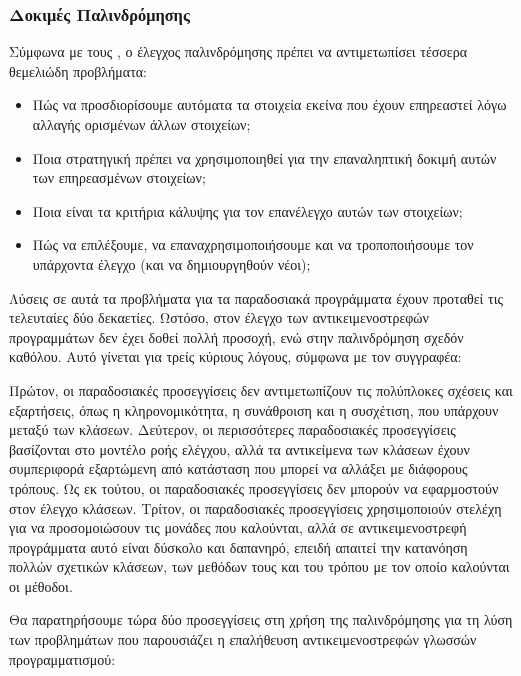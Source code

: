 \documentclass[12pt]{article}
\begin{document}
\subsubsection{Δοκιμές Παλινδρόμησης}

Σύμφωνα με τους \textcite{kung}, ο έλεγχος παλινδρόμησης πρέπει να αντιμετωπίσει τέσσερα θεμελιώδη προβλήματα:

\begin{itemize}
\item Πώς να προσδιορίσουμε αυτόματα τα στοιχεία εκείνα που έχουν επηρεαστεί λόγω αλλαγής ορισμένων άλλων στοιχείων;
\item Ποια στρατηγική πρέπει να χρησιμοποιηθεί για την επαναληπτική δοκιμή αυτών των επηρεασμένων στοιχείων;
\item Ποια είναι τα κριτήρια κάλυψης για τον επανέλεγχο αυτών των στοιχείων;
\item Πώς να επιλέξουμε, να επαναχρησιμοποιήσουμε και να τροποποιήσουμε τον υπάρχοντα έλεγχο (και να δημιουργηθούν νέοι);
\end{itemize} 

\par Λύσεις σε αυτά τα προβλήματα για τα παραδοσιακά προγράμματα έχουν προταθεί τις τελευταίες δύο δεκαετίες. Ωστόσο, στον έλεγχο των αντικειμενοστρεφών προγραμμάτων δεν έχει δοθεί πολλή προσοχή, ενώ στην παλινδρόμηση σχεδόν καθόλου. Αυτό γίνεται για τρείς κύριους λόγους, σύμφωνα με τον συγγραφέα:

\par Πρώτον, οι παραδοσιακές προσεγγίσεις δεν αντιμετωπίζουν τις πολύπλοκες σχέσεις και εξαρτήσεις, όπως η κληρονομικότητα, η συνάθροιση και η συσχέτιση, που υπάρχουν μεταξύ των κλάσεων. Δεύτερον, οι περισσότερες παραδοσιακές προσεγγίσεις βασίζονται στο μοντέλο ροής ελέγχου, αλλά τα αντικείμενα των κλάσεων έχουν συμπεριφορά εξαρτώμενη από κατάσταση που μπορεί να αλλάξει με διάφορους τρόπους. Ως εκ τούτου, οι παραδοσιακές προσεγγίσεις δεν μπορούν να εφαρμοστούν στον έλεγχο κλάσεων. Τρίτον, οι παραδοσιακές προσεγγίσεις χρησιμοποιούν στελέχη για να προσομοιώσουν τις μονάδες που καλούνται, αλλά σε αντικειμενοστρεφή προγράμματα αυτό είναι δύσκολο και δαπανηρό, επειδή απαιτεί την κατανόηση πολλών σχετικών κλάσεων, των μεθόδων τους και του τρόπου με τον οποίο καλούνται οι μέθοδοι.

\par Θα παρατηρήσουμε τώρα δύο προσεγγίσεις στη χρήση της παλινδρόμησης για τη λύση των προβλημάτων που παρουσιάζει η επαλήθευση αντικειμενοστρεφών γλωσσών προγραμματισμού:
\end{document}
